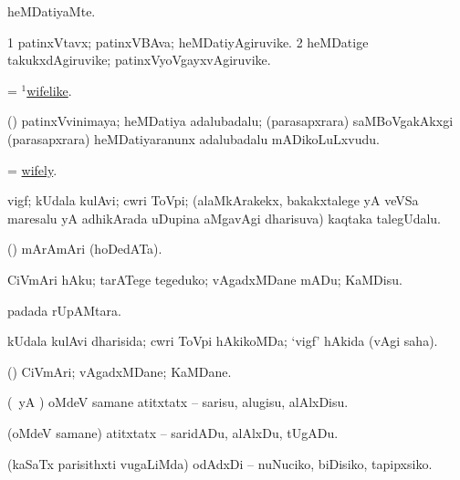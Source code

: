 \bentry
{} 
\gl{\kirxvi}
\expl{}
\bmng
heMDatiyaMte. 
\emng
\eentry

\bentry
{} 
\gl{\nA}
\expl{}
\bmng
\bnum
\num{1} patinxVtavx; patinxVBAva; heMDatiyAgiruvike. 
\num{2} heMDatige takukxdAgiruvike; patinxVyoVgayxvAgiruvike. 
\enum
\emng
\eentry

\bentry
{} 
\gl{\gu}
\expl{}
\bmng
= \hyperlink{wifelike(1)}{$^1$wifelike}. 
\emng
\eentry

\bentry
{} 
\gl{\nA}
\expl{}
\bmng
(\AmA) patinxVvinimaya; heMDatiya adalubadalu; (parasapxrara) saMBoVgakAkxgi (parasapxrara) heMDatiyaranunx adalubadalu mADikoLuLxvudu. 
\emng
\eentry

\bentry
{}
\gl{\gu}
\bmng
= \hyperlink{wifely}{wifely}. 
\emng
\eentry

\bentry 
{} 
\gl{\nA}
\expl{}
\bmng
vigf; kUdala kulAvi; cwri ToVpi; (alaMkArakekx, bakakxtalege yA veVSa maresalu yA adhikArada uDupina aMgavAgi dharisuva) kaqtaka talegUdalu. 
\emng

\noindent
\gl{\pagu}
\bmng
{} (\pArxparx) mArAmAri (hoDedATa). 
\emng
\eentry

\bentry
{}
\gl{\sakirx}
\bmng
CiVmAri hAku; tarATege tegeduko; vAgadxMDane mADu; KaMDisu. 
\emng
\eentry

\bentry
{}
\gl{\nA}
\bmng
{} padada rUpAMtara. 
\emng
\eentry

\bentry
{}
\gl{\gu}
\bmng
kUdala kulAvi dharisida; cwri ToVpi hAkikoMDa; `vigf' hAkida (\saupa vAgi saha). 
\emng
\eentry

\bentry
{}
\gl{\nA}
\bmng
(\AmA) CiVmAri; vAgadxMDane; KaMDane. 
\emng
\eentry

\bentry
{} 
\gl{\sakirx}
\expl{}
\bmng
(\AmA\ yA \pArxM) oMdeV samane atitxtatx -- sarisu, alugisu, alAlxDisu. 
\emng

\noindent
\gl{\akirx}
\bmng
(oMdeV samane) atitxtatx -- saridADu, alAlxDu, tUgADu. 
\emng

\noindent 
\gl{\pagu}
\bmng
{} (kaSaTx parisithxti \mo vugaLiMda) odAdxDi -- nuNuciko, biDisiko, tapipxsiko. 
\emng
\eentry

